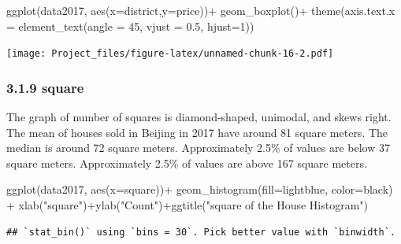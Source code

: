 \documentclass[
]{article}
\newenvironment{Shaded}{\begin{snugshade}}{\end{snugshade}}
\newcommand{\AttributeTok}[1]{\textcolor[rgb]{0.77,0.63,0.00}{#1}}
\newcommand{\DecValTok}[1]{\textcolor[rgb]{0.00,0.00,0.81}{#1}}
\newcommand{\FloatTok}[1]{\textcolor[rgb]{0.00,0.00,0.81}{#1}}
\newcommand{\FunctionTok}[1]{\textcolor[rgb]{0.00,0.00,0.00}{#1}}
\newcommand{\NormalTok}[1]{#1}
\newcommand{\SpecialCharTok}[1]{\textcolor[rgb]{0.00,0.00,0.00}{#1}}
\newcommand{\StringTok}[1]{\textcolor[rgb]{0.31,0.60,0.02}{#1}}
\begin{document}
\begin{Shaded}
\begin{Highlighting}[]
\FunctionTok{ggplot}\NormalTok{(data2017, }\FunctionTok{aes}\NormalTok{(}\AttributeTok{x=}\NormalTok{district,}\AttributeTok{y=}\NormalTok{price))}\SpecialCharTok{+}
  \FunctionTok{geom\_boxplot}\NormalTok{()}\SpecialCharTok{+}
  \FunctionTok{theme}\NormalTok{(}\AttributeTok{axis.text.x =} \FunctionTok{element\_text}\NormalTok{(}\AttributeTok{angle =} \DecValTok{45}\NormalTok{, }\AttributeTok{vjust =} \FloatTok{0.5}\NormalTok{, }\AttributeTok{hjust=}\DecValTok{1}\NormalTok{))}
\end{Highlighting}
\end{Shaded}

\texttt{[image: Project\_files/figure-latex/unnamed-chunk-16-2.pdf]}

\hypertarget{square}{%
\subsubsection{3.1.9 square}\label{square}}

The graph of number of squares is diamond-shaped, unimodal, and skews
right. The mean of houses sold in Beijing in 2017 have around 81 square
meters. The median is around 72 square meters. Approximately 2.5\% of
values are below 37 square meters. Approximately 2.5\% of values are
above 167 square meters.

\begin{Shaded}
\begin{Highlighting}[]
\FunctionTok{ggplot}\NormalTok{(data2017, }\FunctionTok{aes}\NormalTok{(}\AttributeTok{x=}\NormalTok{square))}\SpecialCharTok{+}
  \FunctionTok{geom\_histogram}\NormalTok{(}\AttributeTok{fill=}\StringTok{\textquotesingle{}lightblue\textquotesingle{}}\NormalTok{, }\AttributeTok{color=}\StringTok{\textquotesingle{}black\textquotesingle{}}\NormalTok{) }\SpecialCharTok{+}
  \FunctionTok{xlab}\NormalTok{(}\StringTok{"square"}\NormalTok{)}\SpecialCharTok{+}\FunctionTok{ylab}\NormalTok{(}\StringTok{"Count"}\NormalTok{)}\SpecialCharTok{+}\FunctionTok{ggtitle}\NormalTok{(}\StringTok{"square of the House Histogram"}\NormalTok{) }
\end{Highlighting}
\end{Shaded}

\begin{verbatim}
## `stat_bin()` using `bins = 30`. Pick better value with `binwidth`.
\end{verbatim}
\end{document}
